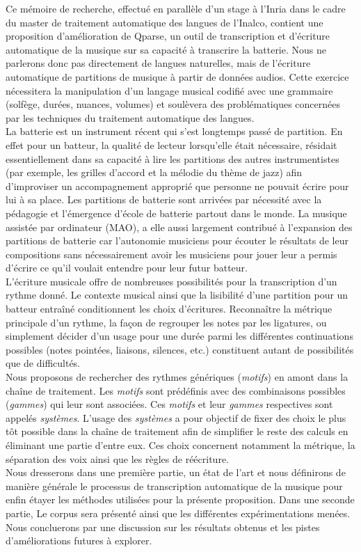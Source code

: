 Ce mémoire de recherche, effectué en parallèle d’un stage à l’Inria dans le cadre du master de traitement automatique des langues de l’Inalco, contient une proposition d’amélioration de Qparse, un outil de transcription et d’écriture automatique de la musique sur sa capacité à transcrire la batterie. Nous ne parlerons donc pas directement de langues naturelles, mais de l’écriture automatique de partitions de musique à partir de données audios. Cette exercice nécessitera la manipulation d’un langage musical codifié avec une grammaire (solfège, durées, nuances, volumes) et soulèvera des problématiques concernées par les techniques du traitement automatique des langues.\\
La batterie est un instrument récent qui s’est longtemps passé de partition. En effet pour un batteur, la qualité de lecteur lorsqu’elle était nécessaire, résidait essentiellement dans sa capacité à lire les partitions des autres instrumentistes (par exemple, les grilles d’accord et la mélodie du thème de jazz) afin d’improviser un accompagnement approprié que personne ne pouvait écrire pour lui à sa place. Les partitions de batterie sont arrivées par nécessité avec la pédagogie et l’émergence d’école de batterie partout dans le monde. La musique assistée par ordinateur (MAO), a elle aussi largement contribué à l’expansion des partitions de batterie car l’autonomie musiciens pour écouter le résultats de leur compositions sans nécessairement avoir les musiciens pour jouer leur a permis d’écrire ce qu’il voulait entendre pour leur futur batteur.\\
L’écriture musicale offre de nombreuses possibilités pour la transcription d’un rythme donné. Le contexte musical ainsi que la lisibilité d’une partition pour un batteur entraîné conditionnent les choix d’écritures. Reconnaître la métrique principale d’un rythme, la façon de regrouper les notes par les ligatures, ou simplement décider d’un usage pour une durée parmi les différentes continuations possibles (notes pointées, liaisons, silences, etc.) constituent autant de possibilités que de difficultés.\\
Nous proposons de rechercher des rythmes génériques (\textit{motifs}) en amont dans la chaîne de traitement. Les \textit{motifs} sont prédéfinis avec des combinaisons possibles (\textit{gammes}) qui leur sont associées. Ces \textit{motifs} et leur \textit{gammes} respectives sont appelés \textit{systèmes}. L’usage des \textit{systèmes} a pour objectif de fixer des choix le plus tôt possible dans la chaîne de traitement afin de simplifier le reste des calculs en éliminant une partie d’entre eux. Ces choix concernent notamment la métrique, la séparation des voix ainsi que les règles de réécriture.\\
Nous dresserons dans une première partie, un état de l’art et nous définirons de manière générale le processus de transcription automatique de la musique pour enfin étayer les méthodes utilisées pour la présente proposition. Dans une seconde partie, Le corpus sera présenté ainsi que les différentes expérimentations menées. Nous concluerons par une discussion sur les résultats obtenus et les pistes d’améliorations futures à explorer.